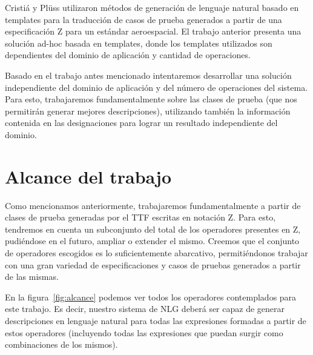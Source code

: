 Cristiá y Plüss \cite{cristia_pluss} utilizaron métodos de generación de lenguaje natural basado en templates para la traducción de casos de prueba generados a partir de una especificación Z para un estándar aeroespacial. El trabajo anterior presenta una solución ad-hoc basada en templates, donde los templates utilizados son dependientes del dominio de aplicación y cantidad de operaciones. 


Basado en el trabajo antes mencionado intentaremos desarrollar una solución independiente del dominio de aplicación y del número de operaciones del sistema. Para esto, trabajaremos fundamentalmente sobre las clases de prueba (que nos permitirán generar mejores descripciones), utilizando también la información contenida en las designaciones para lograr un resultado independiente del dominio.

\section{Alcance del trabajo}

Como mencionamos anteriormente, trabajaremos fundamentalmente a partir de clases de prueba generadas por el TTF escritas en notación Z.
Para esto, tendremos en cuenta un subconjunto del total de los operadores presentes en Z, pudiéndose en el futuro, ampliar o extender el mismo. Creemos que el conjunto de operadores escogidos es lo suficientemente abarcativo, permitiéndonos trabajar con una gran variedad de especificaciones y casos de pruebas generados a partir de las mismas.

En la figura~\ref{fig:alcance} podemos ver todos los operadores contemplados para este trabajo. Es decir, nuestro sistema de NLG deberá ser capaz de generar descripciones en lenguaje natural para todas las expresiones formadas a partir de estos operadores (incluyendo todas las expresiones que puedan surgir como combinaciones de los mismos).

